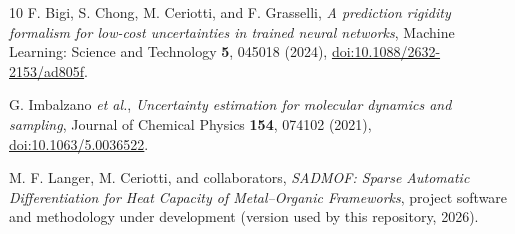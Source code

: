 \documentclass[10pt,a4paper,twocolumn]{article}
\begin{document}
\begin{thebibliography}{10}
F. Bigi, S. Chong, M. Ceriotti, and F. Grasselli,
\emph{A prediction rigidity formalism for low-cost uncertainties in trained
neural networks}, Machine Learning: Science and Technology \textbf{5}, 045018
(2024),
\href{https://doi.org/10.1088/2632-2153/ad805f}{doi:10.1088/2632-2153/ad805f}.

G. Imbalzano \emph{et al.},
\emph{Uncertainty estimation for molecular dynamics and sampling}, Journal of
Chemical Physics \textbf{154}, 074102 (2021),
\href{https://doi.org/10.1063/5.0036522}{doi:10.1063/5.0036522}.

M. F. Langer, M. Ceriotti, and collaborators,
\emph{SADMOF: Sparse Automatic Differentiation for Heat Capacity of
Metal--Organic Frameworks}, project software and methodology under
development (version used by this repository, 2026).

\end{thebibliography}
\end{document}

